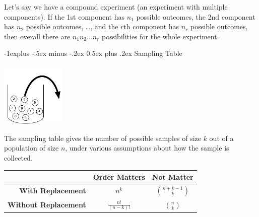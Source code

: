 \documentclass[6pt,landscape]{article}
\makeatletter
\renewcommand{\subsection}{\@startsection{subsection}{2}{0mm}%
                                {-1explus -.5ex minus -.2ex}%
                                {0.5ex plus .2ex}%
                                {\normalfont\normalsize\bfseries}}
\makeatother
\begin{document}
\begin{multicols*}{3}
 Let's say we have a compound experiment (an experiment with multiple components). If the 1st component has $n_1$ possible outcomes, the 2nd component has $n_2$ possible outcomes, \dots, and the $r$th component has $n_r$ possible outcomes, then overall there are $n_1n_2 \dots n_r$ possibilities for the whole experiment.
 
\subsection{Sampling Table}
   \begin{minipage}{\linewidth}
            \centering
             \includegraphics[width=1.2in]{figures/jar.pdf}
        \end{minipage}
    The sampling table gives the number of possible samples of size $k$ out of a population of size $n$, under various assumptions about how the sample is collected. 
        \begin{center}
                \setlength{\extrarowheight}{7pt}
            \begin{tabular}{r|cc}
                 & \textbf{Order Matters} & \textbf{Not Matter} \\ \hline
                \textbf{With Replacement} & $\displaystyle n^k$ & $\displaystyle{n+k-1 \choose k}$ \\
                \textbf{Without Replacement} & $\displaystyle\frac{n!}{(n - k)!}$ & $\displaystyle{n \choose k}$
            \end{tabular}
        \end{center}

\end{multicols*}
\end{document}
